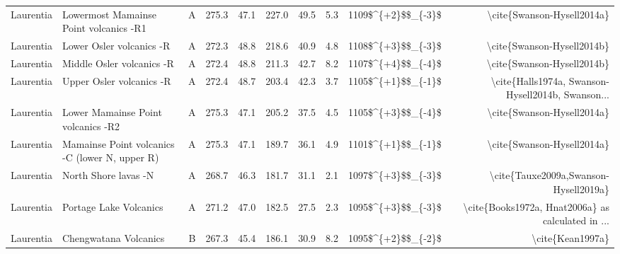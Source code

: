 \begin{longtable}{p{1 in}p{1 in}rrrrrrrr}
                     Laurentia &           Lowermost Mamainse Point volcanics -R1 &      A &     275.3 &      47.1 & 227.0 &  49.5 &       5.3 &     1109\$\textasciicircum \{+2\}\$\$\_\{-3\}\$ &                         \textbackslash cite\{Swanson-Hysell2014a\} \\
                     Laurentia &                         Lower Osler volcanics -R &      A &     272.3 &      48.8 & 218.6 &  40.9 &       4.8 &     1108\$\textasciicircum \{+3\}\$\$\_\{-3\}\$ &                         \textbackslash cite\{Swanson-Hysell2014b\} \\
                     Laurentia &                        Middle Osler volcanics -R &      A &     272.4 &      48.8 & 211.3 &  42.7 &       8.2 &     1107\$\textasciicircum \{+4\}\$\$\_\{-4\}\$ &                         \textbackslash cite\{Swanson-Hysell2014b\} \\
                     Laurentia &                         Upper Osler volcanics -R &      A &     272.4 &      48.7 & 203.4 &  42.3 &       3.7 &     1105\$\textasciicircum \{+1\}\$\$\_\{-1\}\$ &  \textbackslash cite\{Halls1974a, Swanson-Hysell2014b, Swanson... \\
                     Laurentia &               Lower Mamainse Point volcanics -R2 &      A &     275.3 &      47.1 & 205.2 &  37.5 &       4.5 &     1105\$\textasciicircum \{+3\}\$\$\_\{-4\}\$ &                         \textbackslash cite\{Swanson-Hysell2014a\} \\
                     Laurentia &   Mamainse Point volcanics -C (lower N, upper R) &      A &     275.3 &      47.1 & 189.7 &  36.1 &       4.9 &     1101\$\textasciicircum \{+1\}\$\$\_\{-1\}\$ &                         \textbackslash cite\{Swanson-Hysell2014a\} \\
                     Laurentia &                             North Shore lavas -N &      A &     268.7 &      46.3 & 181.7 &  31.1 &       2.1 &     1097\$\textasciicircum \{+3\}\$\$\_\{-3\}\$ &              \textbackslash cite\{Tauxe2009a,Swanson-Hysell2019a\} \\
                     Laurentia &                           Portage Lake Volcanics &      A &     271.2 &      47.0 & 182.5 &  27.5 &       2.3 &     1095\$\textasciicircum \{+3\}\$\$\_\{-3\}\$ &  \textbackslash cite\{Books1972a, Hnat2006a\} as calculated in ... \\
                     Laurentia &                            Chengwatana Volcanics &      B &     267.3 &      45.4 & 186.1 &  30.9 &       8.2 &     1095\$\textasciicircum \{+2\}\$\$\_\{-2\}\$ &                                   \textbackslash cite\{Kean1997a\} \\

\end{longtable}
